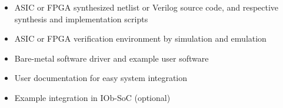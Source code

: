 %

\begin{itemize}
  \itemsep-0.5em
\item ASIC or FPGA synthesized netlist or Verilog source code, and respective
  synthesis and implementation scripts
\item ASIC or FPGA verification environment by simulation and emulation
\item Bare-metal software driver and example user software
\item User documentation for easy system integration
\item Example integration in IOb-SoC (optional)
\end{itemize}
